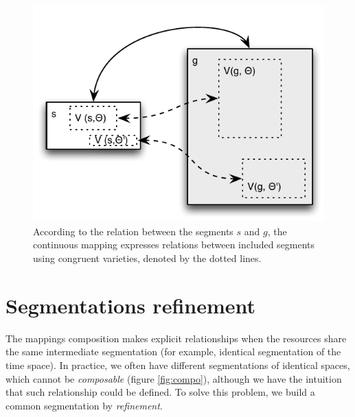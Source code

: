 \documentclass[letterpaper, 12pt]{article}
\newcommand{\variete}			{\ensuremath{\mathcal{V}}}
\begin{document}
\begin{figure} %
\begin{center}
	\psfrag{V(s,t)}{$\variete(s,\Theta)$}
	\psfrag{V(g,t)}{$\variete(g,\Theta)$}
	\includegraphics[width=0.7\baseimgwidth]{imgs/vmapping}
\caption{According to the relation between the segments $s$ and $g$, the continuous mapping expresses relations between included segments using congruent varieties, denoted by the dotted lines.}
\label{fig:vmapping}
\end{center}
\end{figure}

\section{Segmentations refinement}
\label{subsec:isegm}

The mappings composition makes explicit relationships when the resources share the same intermediate segmentation (for example, identical segmentation of the time space). 
In practice, we often have different segmentations of identical spaces, which cannot be \emph{composable} (figure \ref{fig:compo}), although we have the intuition that such relationship could be defined. To solve this problem, we build a common segmentation by \emph{refinement}.
\end{document}
